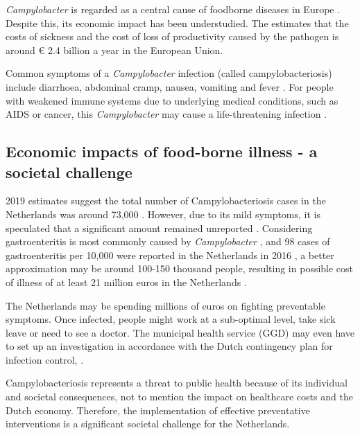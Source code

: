 \textit{Campylobacter} is regarded as a central cause of foodborne diseases in Europe \parencite{european_food_safety_authority_european_2019}. Despite this, its economic impact has been understudied. The \citeauthor{european_food_safety_authority_campylobacter_nodate} estimates that the costs of sickness and the cost of loss of productivity caused by the pathogen is around \euro{} 2.4 billion a year in the European Union. 

Common symptoms of a \textit{Campylobacter} infection (called campylobacteriosis) include diarrhoea, abdominal cramp, nausea, vomiting and fever \parencite{hussein_campylobacter_2016}. For people with weakened immune systems due to underlying medical conditions, such as AIDS or cancer, this \textit{Campylobacter} may cause a life-threatening infection \parencite{wassenaar_pathophysiology_1999}.

\subsection*{Economic impacts of food-borne illness - a societal challenge}

2019 estimates suggest the total number of Campylobacteriosis cases in the Netherlands was  around 73,000 \parencite{lagerweij_disease_2020}. However, due to its mild symptoms, it is speculated that a significant amount remained unreported \parencite{koutsoumanis_update_2020}. Considering gastroenteritis is most commonly caused by \textit{Campylobacter} \parencite{fouts_major_2005}, and 98 cases of gastroenteritis per 10,000 were reported in the Netherlands in 2016 \parencite{van_pelt_jaarraport_2016}, a better approximation may be around 100-150 thousand people, resulting in possible cost of illness of at least 21 million euros in the Netherlands \parencite{havelaar_costs_2005}.

The Netherlands may be spending millions of euros on fighting preventable symptoms. Once infected, people might work at a sub-optimal level, take sick leave or need to see a doctor. The municipal health service (GGD) may even have to set up an investigation in accordance with the Dutch contingency plan for infection control, . 

Campylobacteriosis represents a threat to public health because of its individual and societal consequences, not to mention the impact on healthcare costs and the Dutch economy. Therefore, the implementation of effective preventative interventions is a significant societal challenge for the Netherlands.


